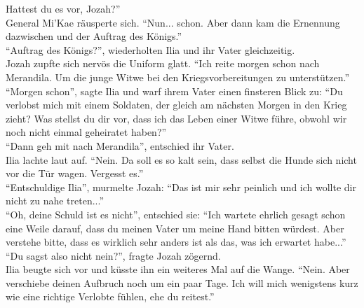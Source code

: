 Hattest du es vor, Jozah?''\\
General Mi'Kae räusperte sich. ``Nun... schon. Aber dann kam die Ernennung dazwischen und der 
Auftrag des Königs.''\\
``Auftrag des Königs?'', wiederholten Ilia und ihr Vater gleichzeitig.\\
Jozah zupfte sich nervös die Uniform glatt. ``Ich reite morgen schon nach Merandila. Um die junge 
Witwe bei den Kriegsvorbereitungen zu unterstützen.''\\
``Morgen schon'', sagte Ilia und warf ihrem Vater einen finsteren Blick zu: ``Du verlobst mich mit 
einem Soldaten, der gleich am nächsten Morgen in den Krieg zieht? Was stellst du dir vor, dass ich 
das Leben einer Witwe führe, obwohl wir noch nicht einmal geheiratet haben?''\\
``Dann geh mit nach Merandila'', entschied ihr Vater.\\
Ilia lachte laut auf. ``Nein. Da soll es so kalt sein, dass selbst die Hunde sich nicht vor die Tür 
wagen. Vergesst es.''\\
``Entschuldige Ilia'', murmelte Jozah: ``Das ist mir sehr peinlich und ich wollte dir nicht zu nahe 
treten...''\\
``Oh, deine Schuld ist es nicht'', entschied sie: ``Ich wartete ehrlich gesagt schon eine Weile 
darauf, dass du meinen Vater um meine Hand bitten würdest. Aber verstehe bitte, dass es wirklich 
sehr anders ist als das, was ich erwartet habe...''\\
``Du sagst also nicht nein?'', fragte Jozah zögernd.\\
Ilia beugte sich vor und küsste ihn ein weiteres Mal auf die Wange. ``Nein. Aber verschiebe deinen 
Aufbruch noch um ein paar Tage. Ich will mich wenigstens kurz wie eine richtige Verlobte fühlen, 
ehe du reitest.''\\




 
